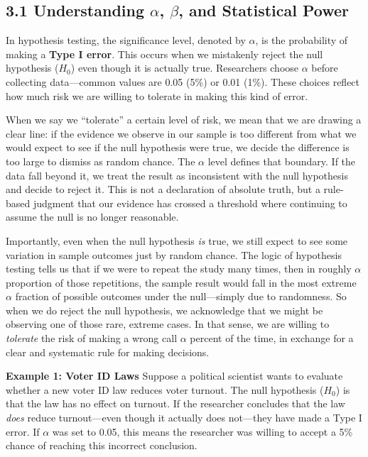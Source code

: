 \documentclass[12pt]{article}
\begin{document}
\subsection*{3.1 Understanding $\alpha$, $\beta$, and Statistical Power}

In hypothesis testing, the significance level, denoted by $\alpha$, is the probability of making a \textbf{Type I error}. This occurs when we mistakenly reject the null hypothesis ($H_0$) even though it is actually true. Researchers choose $\alpha$ before collecting data—common values are 0.05 (5\%) or 0.01 (1\%). These choices reflect how much risk we are willing to tolerate in making this kind of error.

When we say we ``tolerate'' a certain level of risk, we mean that we are drawing a clear line: if the evidence we observe in our sample is too different from what we would expect to see if the null hypothesis were true, we decide the difference is too large to dismiss as random chance. The $\alpha$ level defines that boundary. If the data fall beyond it, we treat the result as inconsistent with the null hypothesis and decide to reject it. This is not a declaration of absolute truth, but a rule-based judgment that our evidence has crossed a threshold where continuing to assume the null is no longer reasonable.

Importantly, even when the null hypothesis \textit{is} true, we still expect to see some variation in sample outcomes just by random chance. The logic of hypothesis testing tells us that if we were to repeat the study many times, then in roughly $\alpha$ proportion of those repetitions, the sample result would fall in the most extreme $\alpha$ fraction of possible outcomes under the null—simply due to randomness. So when we do reject the null hypothesis, we acknowledge that we might be observing one of those rare, extreme cases. In that sense, we are willing to \textit{tolerate} the risk of making a wrong call $\alpha$ percent of the time, in exchange for a clear and systematic rule for making decisions.

\textbf{Example 1: Voter ID Laws}  
Suppose a political scientist wants to evaluate whether a new voter ID law reduces voter turnout. The null hypothesis ($H_0$) is that the law has no effect on turnout. If the researcher concludes that the law \textit{does} reduce turnout—even though it actually does not—they have made a Type I error. If $\alpha$ was set to 0.05, this means the researcher was willing to accept a 5\% chance of reaching this incorrect conclusion.
\end{document}
